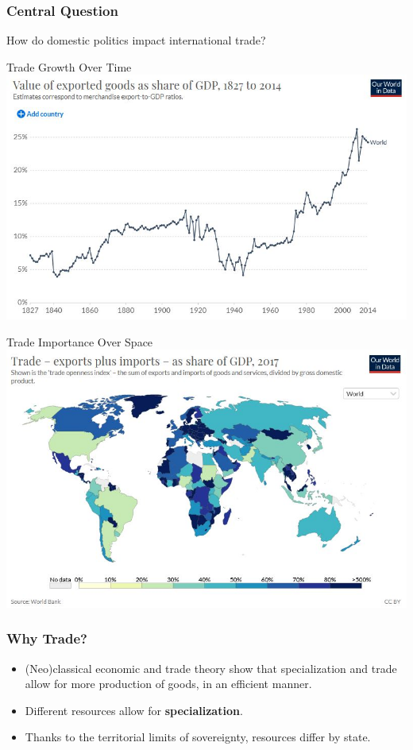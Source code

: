 \documentclass{beamer}
\begin{document}
\begin{frame} 
	\frametitle{\LARGE{Central Question}}
	\centering
	\Large{How do domestic politics impact international trade?}
\end{frame}

\begin{frame}{\LARGE Trade Growth Over Time}
    \centering
\includegraphics[width=\textwidth,height=0.8\textheight,keepaspectratio]{world export values.JPG}
\end{frame}

\begin{frame}{\LARGE Trade Importance Over Space}
    \centering
\includegraphics[width=\textwidth,height=0.8\textheight,keepaspectratio]{imports plus exports.JPG}
\end{frame}

\begin{frame} 
	\frametitle{\LARGE Why Trade?}
	\begin{itemize}
			\item (Neo)classical economic and trade theory show that specialization and trade  allow for more production of goods, in an efficient manner. \pause
			\item Different resources allow for \textbf{specialization}.
			\item Thanks to the territorial limits of sovereignty, resources differ by state.
	\end{itemize}
\end{frame}
\end{document}
